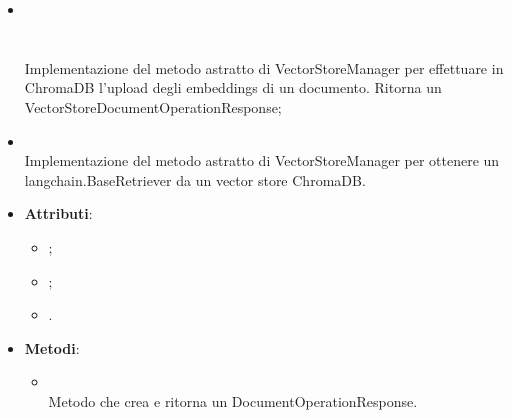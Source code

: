 \documentclass[10pt, a4paper]{article}
\begin{document}
\begin{itemize}
\begin{itemize}
        \item {}\\ 
        \\ 
        \\ 
        Implementazione del metodo astratto di VectorStoreManager per effettuare in ChromaDB l'upload degli embeddings di un documento. Ritorna un VectorStoreDocumentOperationResponse;
        \item {}\\
        Implementazione del metodo astratto di VectorStoreManager per ottenere un langchain.BaseRetriever da un vector store ChromaDB.
    \end{itemize}
\end{itemize}

\label{VectorStoreDocumentOperationResponseDettaglio}
\begin{itemize}
    \item \textbf{Attributi}:
    \begin{itemize}
        \item {};
        \item {};
        \item {}.
    \end{itemize}
    \item \textbf{Metodi}:
    \begin{itemize}
       
       \item {}\\
       Metodo che crea e ritorna un DocumentOperationResponse.
    \end{itemize}
\end{itemize}
\end{document}
